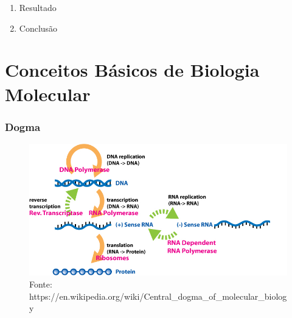 \documentclass{beamer}
\begin{document}
\begin{frame}
\begin{enumerate}
			\item Resultado\\ 
			\item Conclusão\\
		\end{enumerate}
	\end{frame}

	\setcounter{framenumber}{0}
	\setcounter{showProgressBar}{2}
	\setcounter{showSlideNumbers}{2}
	
	\section{Conceitos Básicos de Biologia Molecular}
	
		\begin{frame}\frametitle{Dogma}
		\begin{figure}[hbtp]
			\centering
			\includegraphics[scale=0.45]{img/dogma.png}
			\caption{\tiny{Fonte: https://en.wikipedia.org/wiki/Central\_dogma\_of\_molecular\_biology}}
		\end{figure}
		\end{frame}
\end{document}
